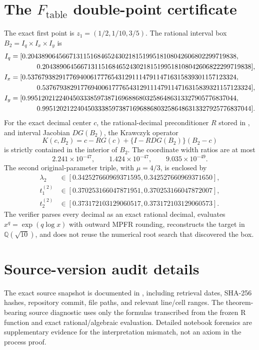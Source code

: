 \documentclass[11pt]{article}
\newcommand{\Table}{F_{\mathrm{table}}}
\begin{document}
\section{The \texorpdfstring{$\Table$}{Ftable} double-point certificate}\label{app:certificate}
The exact first point is $z_1=(1/2,1/10,3/5)$.  The rational interval box $B_2=I_q\times I_x\times I_y$ is
\begin{align*}
I_q={}&[0.204389064566713115168465243021815199518108042606802299719838,\\
&\hspace{2.4em}0.204389064566713115168465243021815199518108042606822299719838],\\
I_x={}&[0.537679382917769400617776543129111479114716315839301157123324,\\
&\hspace{2.4em}0.537679382917769400617776543129111479114716315839321157123324],\\
I_y={}&[0.995120212240450333859738716968868032586486313327905776837044,\\
&\hspace{2.4em}0.995120212240450333859738716968868032586486313327925776837044].
\end{align*}
For the exact decimal center $c$, the rational-decimal preconditioner $R$ stored in , and interval Jacobian $DG(B_2)$, the Krawczyk operator
\[
K(c,B_2)=c-RG(c)+\{I-RDG(B_2)\}(B_2-c)
\]
is strictly contained in the interior of $B_2$.  The coordinate width ratios are at most
\[
2.241\times10^{-47},\qquad
1.424\times10^{-47},\qquad
9.035\times10^{-49}.
\]
The second original-parameter triple, with $\mu=4/3$, is enclosed by
\begin{align*}
\lambda_2&\in[0.342527660969371595,0.342527660969371650],\\
t_1^{(2)}&\in[0.370253166047871951,0.370253166047872007],\\
t_2^{(2)}&\in[0.373172103129060517,0.373172103129060573].
\end{align*}
The verifier parses every decimal as an exact rational decimal, evaluates $x^q=\exp(q\log x)$ with outward MPFR rounding, reconstructs the target in $\mathbb Q(\sqrt{10})$, and does not reuse the numerical root search that discovered the box.

\section{Source-version audit details}\label{app:source}
The exact source snapshot is documented in , including retrieval dates, SHA-256 hashes, repository commit, file paths, and relevant line/cell ranges.  The theorem-bearing source diagnostic uses only the formulas transcribed from the frozen R function and exact rational/algebraic evaluation.  Detailed notebook forensics are supplementary evidence for the interpretation mismatch, not an axiom in the process proof.
\end{document}
